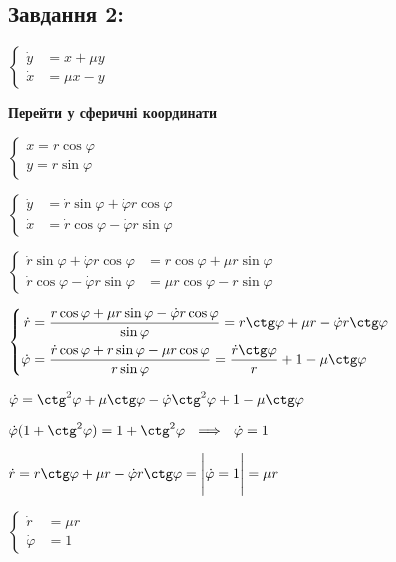 \subsection*{Завдання 2:}
$\left\{\begin{aligned}
    \dot{y} &= x + \mu y \\
    \dot{x} &= \mu x - y
\end{aligned}\right.$

\textbf{Перейти у сферичні координати}

$\left\{\begin{aligned}
    x = r\cos \varphi\\
    y = r\sin \varphi
\end{aligned}\right.$

$\left\{\begin{aligned}
    \dot{y} &= \dot{r}\sin \varphi + \dot{\varphi}r \cos \varphi \\
    \dot{x} &= \dot{r}\cos \varphi - \dot{\varphi} r \sin \varphi
\end{aligned}\right.$



$\left\{\begin{aligned}
    \dot{r}\sin \varphi + \dot{\varphi}r \cos \varphi &=  r\cos \varphi + \mu r \sin \varphi\\
    \dot{r}\cos \varphi - \dot{\varphi} r \sin \varphi &= \mu r \cos \varphi - r \sin \varphi
\end{aligned}\right.$

$\left\{\begin{aligned}
    \dot{r} &= \frac{r\cos \varphi + \mu r \sin \varphi -\dot{\varphi}r \cos \varphi}{ \sin\varphi} = 
    r\ctg\varphi + \mu r - \dot{\varphi}r\ctg \varphi\\
    \dot{\varphi} &= \frac{\dot{r}\cos \varphi + r \sin \varphi - \mu r \cos \varphi}{r \sin \varphi} = 
    \frac{\dot{r}\ctg \varphi}{r} + 1 - \mu \ctg \varphi
\end{aligned}\right.$

$\dot{\varphi} = \ctg^2\varphi + \mu \ctg\varphi - \dot{\varphi}\ctg^2 \varphi +1 - \mu \ctg \varphi$

$\dot{\varphi} (1 + \ctg^2 \varphi)= 1 + \ctg^2 \varphi \ \ \Longrightarrow \ \ \dot{\varphi} = 1$

$\dot{r} = r\ctg\varphi + \mu r - \dot{\varphi}r\ctg \varphi = \Bigg| \dot{\varphi} = 1 \Bigg| = \mu r$

$\left\{\begin{aligned}
    \dot{r} &= \mu r\\
    \dot{\varphi} &= 1
\end{aligned}\right.$

